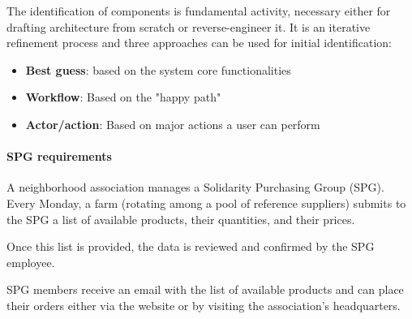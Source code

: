 The identification of components is fundamental activity, necessary either for
drafting architecture from scratch or reverse-engineer it.
It is an iterative refinement process and three approaches can be used for
initial identification:

\begin{itemize}
  \item \textbf{Best guess}: based on the system core functionalities
  \item \textbf{Workflow}: Based on the "happy path"
  \item \textbf{Actor/action}: Based on major actions a user can perform
\end{itemize}


\paragraph{SPG requirements}

A neighborhood association manages a Solidarity Purchasing Group
(SPG). Every Monday, a farm (rotating among a pool of reference
suppliers) submits to the SPG a list of available products, their
quantities, and their prices.\newline

Once this list is provided, the data is reviewed and confirmed by the
SPG employee.\newline

SPG members receive an email with the list of available products and
can place their orders either via the website or by visiting the
association's headquarters.\newline




